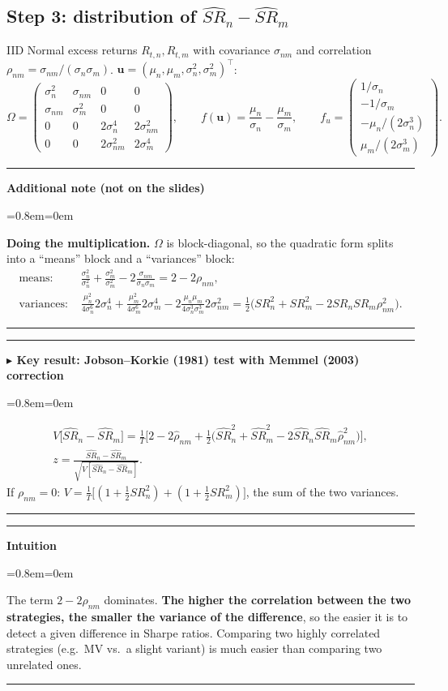 \documentclass[11pt,a4paper]{report}
\newenvironment{notebox}[1]
  {\par\medskip\Needspace{6\baselineskip}\noindent\rule{\linewidth}{0.4pt}\par\nopagebreak
   \noindent\textbf{#1}\par\nopagebreak
   \begin{list}{}{\leftmargin=0.8em\rightmargin=0em\topsep=2pt}\item[]}
  {\end{list}\nopagebreak\noindent\rule{\linewidth}{0.4pt}\par\medskip}
\newenvironment{keybox}[1][]{\begin{notebox}{$\blacktriangleright$ Key result#1}}{\end{notebox}}
\newenvironment{intuition}{\begin{notebox}{Intuition}}{\end{notebox}}
\newenvironment{addnote}{\begin{notebox}{Additional note (not on the slides)}}{\end{notebox}}
\newcommand{\T}{^{\top}}
\begin{document}
\subsection{Step 3: distribution of $\widehat{SR}_n-\widehat{SR}_m$}
IID Normal excess returns $R_{t,n},R_{t,m}$ with covariance $\sigma_{nm}$ and
correlation $\rho_{nm}=\sigma_{nm}/(\sigma_n\sigma_m)$.
$\bm u=(\mu_n,\mu_m,\sigma_n^2,\sigma_m^2)\T$:
\[
\Omega=\begin{pmatrix}
\sigma_n^2&\sigma_{nm}&0&0\\
\sigma_{nm}&\sigma_m^2&0&0\\
0&0&2\sigma_n^4&2\sigma_{nm}^2\\
0&0&2\sigma_{nm}^2&2\sigma_m^4
\end{pmatrix},\qquad
f(\bm u)=\frac{\mu_n}{\sigma_n}-\frac{\mu_m}{\sigma_m},\qquad
f_u=\begin{pmatrix}1/\sigma_n\\-1/\sigma_m\\-\mu_n/(2\sigma_n^3)\\ \mu_m/(2\sigma_m^3)\end{pmatrix}.
\]
\begin{addnote}
\textbf{Doing the multiplication.} $\Omega$ is block-diagonal, so the quadratic
form splits into a ``means'' block and a ``variances'' block:
\begin{align*}
\text{means: }&\frac{\sigma_n^2}{\sigma_n^2}+\frac{\sigma_m^2}{\sigma_m^2}-2\frac{\sigma_{nm}}{\sigma_n\sigma_m}=2-2\rho_{nm},\\
\text{variances: }&\frac{\mu_n^2}{4\sigma_n^6}2\sigma_n^4+\frac{\mu_m^2}{4\sigma_m^6}2\sigma_m^4
-2\frac{\mu_n\mu_m}{4\sigma_n^3\sigma_m^3}2\sigma_{nm}^2
=\tfrac12\big(SR_n^2+SR_m^2-2SR_nSR_m\rho_{nm}^2\big).
\end{align*}
\end{addnote}

\begin{keybox}[: Jobson--Korkie (1981) test with Memmel (2003) correction]
\begin{gather*}
V\big[\widehat{SR}_n-\widehat{SR}_m\big]=\frac1T\Big[2-2\hat\rho_{nm}+\frac12\big(\widehat{SR}_n^2+\widehat{SR}_m^2-2\widehat{SR}_n\widehat{SR}_m\hat\rho_{nm}^2\big)\Big],\\
z=\frac{\widehat{SR}_n-\widehat{SR}_m}{\sqrt{V[\widehat{SR}_n-\widehat{SR}_m]}} .
\end{gather*}
If $\rho_{nm}=0$: $V=\frac1T\big[(1+\frac12SR_n^2)+(1+\frac12SR_m^2)\big]$, the sum of the two variances.
\end{keybox}
\begin{intuition}
The term $2-2\rho_{nm}$ dominates. \textbf{The higher the correlation between the
two strategies, the smaller the variance of the difference}, so the easier it is
to detect a given difference in Sharpe ratios. Comparing two highly correlated
strategies (e.g.\ MV vs.\ a slight variant) is much easier than comparing two
unrelated ones.
\end{intuition}
\end{document}
